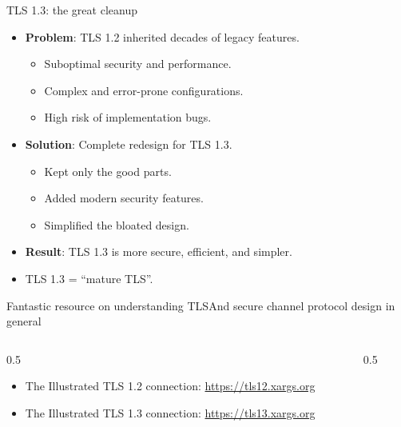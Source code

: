 \ifdefined\PRESENTATION\else\PassOptionsToClass{handout}{beamer}\fi\documentclass[aspectratio=169, lualatex]{beamer}
\begin{document}
\begin{frame}{TLS 1.3: the great cleanup}
	\begin{itemize}[<+->]
		\item \textbf{Problem}: TLS 1.2 inherited decades of legacy features.
		      \begin{itemize}
			      \item Suboptimal security and performance.
			      \item Complex and error-prone configurations.
			      \item High risk of implementation bugs.
		      \end{itemize}
		\item \textbf{Solution}: Complete redesign for TLS 1.3.
		      \begin{itemize}
			      \item Kept only the good parts.
			      \item Added modern security features.
			      \item Simplified the bloated design.
		      \end{itemize}
		\item \textbf{Result}: TLS 1.3 is more secure, efficient, and simpler.
		\item TLS 1.3 = ``mature TLS''.
	\end{itemize}
\end{frame}

\begin{frame}{Fantastic resource on understanding TLS}{And secure channel protocol design in general}
	\begin{columns}[c]
		\begin{column}{0.5\textwidth}
			\begin{itemize}
				\item The Illustrated TLS 1.2 connection: \url{https://tls12.xargs.org}
				\item The Illustrated TLS 1.3 connection: \url{https://tls13.xargs.org}
			\end{itemize}
		\end{column}
		\begin{column}{0.5\textwidth}
		\end{column}
	\end{columns}
\end{frame}
\end{document}
